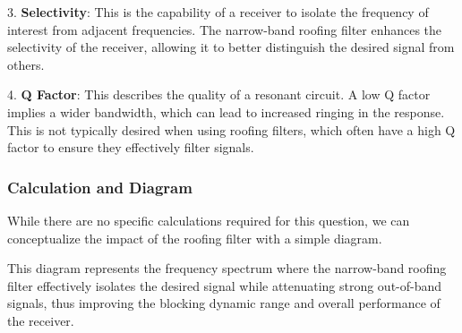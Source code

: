 3. \textbf{Selectivity}: This is the capability of a receiver to isolate the frequency of interest from adjacent frequencies. The narrow-band roofing filter enhances the selectivity of the receiver, allowing it to better distinguish the desired signal from others.

4. \textbf{Q Factor}: This describes the quality of a resonant circuit. A low Q factor implies a wider bandwidth, which can lead to increased ringing in the response. This is not typically desired when using roofing filters, which often have a high Q factor to ensure they effectively filter signals.

\subsubsection{Calculation and Diagram}
While there are no specific calculations required for this question, we can conceptualize the impact of the roofing filter with a simple diagram. 

\begin{center}
\end{center}
This diagram represents the frequency spectrum where the narrow-band roofing filter effectively isolates the desired signal while attenuating strong out-of-band signals, thus improving the blocking dynamic range and overall performance of the receiver.
